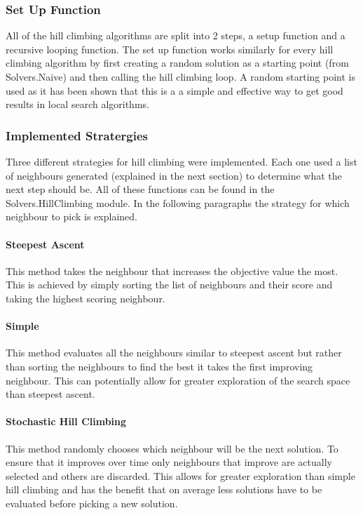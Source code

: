 \documentclass[a4paper]{article}
\begin{document}
\subsubsection{Set Up Function}
All of the hill climbing algorithms are split into 2 steps, a setup function and a recursive looping function.
The set up function works similarly for every hill climbing algorithm by first creating a random solution as a starting point (from Solvers.Naive) and then calling the hill climbing loop.
A random starting point is used as it has been shown that this is a a simple and effective way to get good results in local search algorithms.
\subsubsection{Implemented Stratergies}
Three different strategies for hill climbing were implemented.
Each one used a list of neighbours generated (explained in the next section) to determine what the next step should be.
All of these functions can be found in the Solvers.HillClimbing module.
In the following paragraphs the strategy for which neighbour to pick is explained.
\paragraph{Steepest Ascent}\vspace*{-4mm}
This method takes the neighbour that increases the objective value the most.
This is achieved by simply sorting the list of neighbours and their score and taking the highest scoring neighbour.

\paragraph{Simple}\vspace*{-4mm}
This method evaluates all the neighbours similar to steepest ascent but rather than sorting the neighbours to find the best it takes the first improving neighbour.
This can potentially allow for greater exploration of the search space than steepest ascent.

\paragraph{Stochastic Hill Climbing}\vspace*{-4mm}
This method randomly chooses which neighbour will be the next solution.
To ensure that it improves over time only neighbours that improve are actually selected and others are discarded.
This allows for greater exploration than simple hill climbing and has the benefit that on average less solutions have to be evaluated before picking a new solution.
\end{document}
